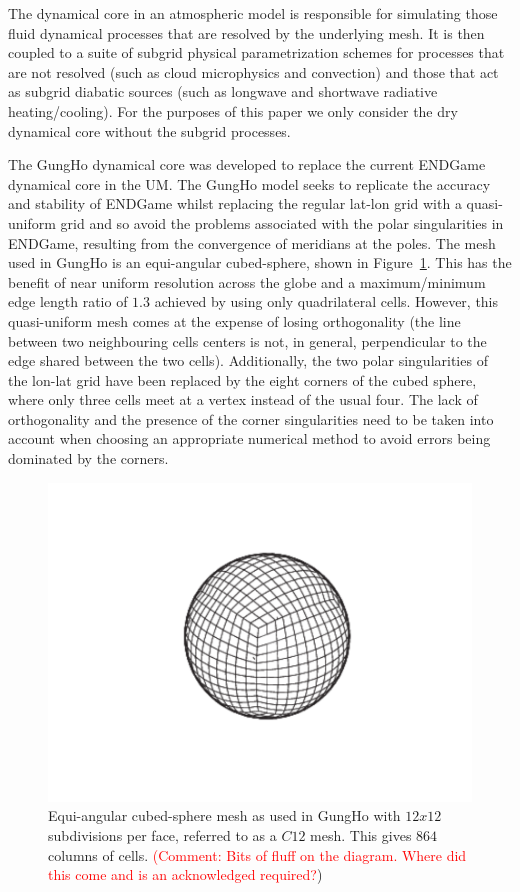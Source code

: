 \documentclass[times]{elsarticle}
\begin{document}
The dynamical core in an atmospheric model is responsible for
simulating those fluid dynamical processes that are resolved by the
underlying mesh. It is then coupled to a suite of subgrid physical
parametrization schemes for processes that are not resolved (such as
cloud microphysics and convection) and those that act as subgrid
diabatic sources (such as longwave and shortwave radiative
heating/cooling). For the purposes of this paper we only consider
the dry dynamical core without the subgrid processes.

The GungHo dynamical core was developed to replace the current ENDGame
dynamical core in the UM. The GungHo model seeks to replicate the
accuracy and stability of ENDGame whilst replacing the regular lat-lon
grid with a quasi-uniform grid and so avoid the problems associated
with the polar singularities in ENDGame, resulting from the
convergence of meridians at the poles. The mesh used in GungHo is an
equi-angular cubed-sphere, shown in Figure~\ref{fig:cubed-sphere}.
This has the benefit of near uniform resolution across the globe and a
maximum/minimum edge length ratio of $1.3$ achieved by using only
quadrilateral cells.  However, this quasi-uniform mesh comes at the
expense of losing orthogonality (the line between two neighbouring
cells centers is not, in general, perpendicular to the edge shared
between the two cells). Additionally, the two polar singularities of
the lon-lat grid have been replaced by the eight corners of
the cubed sphere, where only three cells meet at a vertex instead of
the usual four. The lack of orthogonality and the presence of the
corner singularities need to be taken into account when choosing an
appropriate numerical method to avoid errors being dominated by the
corners.
%
\begin{figure}
\centering\includegraphics[width=0.8\linewidth]{Cubed-Sphere.pdf}
\caption{\label{fig:cubed-sphere} Equi-angular cubed-sphere mesh as
used in GungHo with $12x12$ subdivisions per face, 
referred to as a $C12$ mesh. This gives $864$ columns of cells. 
\textcolor{red}{(Comment: Bits of fluff on the diagram. 
Where did this come and is an acknowledged required?})
}
\end{figure}
%
\end{document}
